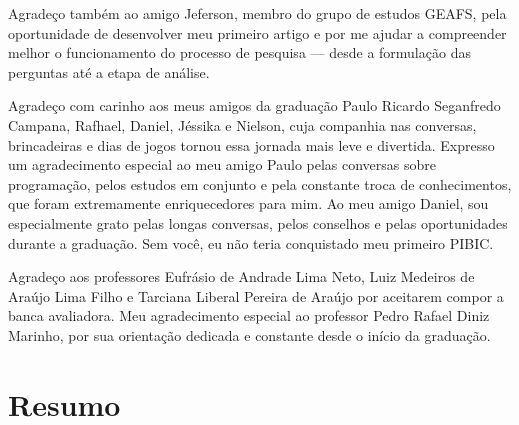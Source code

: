 \documentclass[
  12pt,
  a4paper,
]{scrreprt}
\begin{document}
\vspace{12pt}

Agradeço também ao amigo Jeferson, membro do grupo de estudos GEAFS,
pela oportunidade de desenvolver meu primeiro artigo e por me ajudar a
compreender melhor o funcionamento do processo de pesquisa --- desde a
formulação das perguntas até a etapa de análise.

\vspace{12pt}

Agradeço com carinho aos meus amigos da graduação Paulo Ricardo
Seganfredo Campana, Rafhael, Daniel, Jéssika e Nielson, cuja companhia
nas conversas, brincadeiras e dias de jogos tornou essa jornada mais
leve e divertida. Expresso um agradecimento especial ao meu amigo Paulo
pelas conversas sobre programação, pelos estudos em conjunto e pela
constante troca de conhecimentos, que foram extremamente enriquecedores
para mim. Ao meu amigo Daniel, sou especialmente grato pelas longas
conversas, pelos conselhos e pelas oportunidades durante a graduação.
Sem você, eu não teria conquistado meu primeiro PIBIC.

\vspace{12pt}

Agradeço aos professores Eufrásio de Andrade Lima Neto, Luiz Medeiros de
Araújo Lima Filho e Tarciana Liberal Pereira de Araújo por aceitarem
compor a banca avaliadora. Meu agradecimento especial ao professor Pedro
Rafael Diniz Marinho, por sua orientação dedicada e constante desde o
início da graduação.

\clearpage
\endgroup

\chapter*{\centering Resumo}
\thispagestyle{empty}
\end{document}
